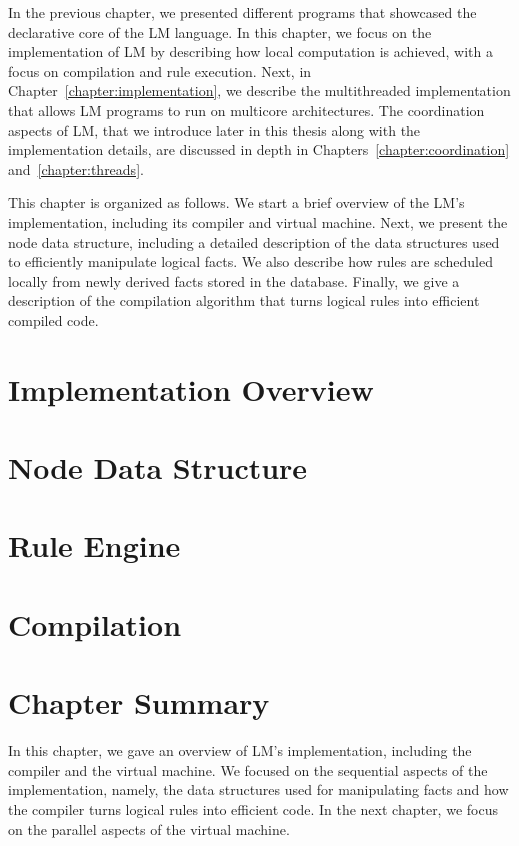 
In the previous chapter, we presented different programs that showcased the
declarative core of the LM language. In this chapter, we focus on the
implementation of LM by describing how local computation is achieved, with a
focus on compilation and rule execution.  Next, in
Chapter~\ref{chapter:implementation}, we describe the multithreaded
implementation that allows LM programs to run on multicore architectures. The
coordination aspects of LM, that we introduce later in this thesis along with
the implementation details, are discussed in depth in
Chapters~\ref{chapter:coordination} and~\ref{chapter:threads}.

This chapter is organized as follows. We start a brief overview of the LM's
implementation, including its compiler and virtual machine. Next, we present the
node data structure, including a detailed description of the data structures
used to efficiently manipulate logical facts.  We also describe how rules are
scheduled locally from newly derived facts stored in the database.  Finally, we
give a description of the compilation algorithm that turns logical rules into
efficient compiled code.


\section{Implementation Overview}


\section{Node Data Structure}\label{sec:data_structures}


\section{Rule Engine}\label{section:local:rule_engine}\label{sec:implementation:rule_engine}


\section{Compilation}


\section{Chapter Summary}

In this chapter, we gave an overview of LM's implementation, including the
compiler and the virtual machine. We focused on the sequential aspects of the
implementation, namely, the data structures used for manipulating facts and how
the compiler turns logical rules into efficient code. In the next chapter, we
focus on the parallel aspects of the virtual machine.
